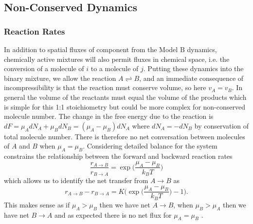 \subsection{Non-Conserved Dynamics}

\subsubsection{Reaction Rates}
In addition to spatial fluxes of component from the Model B dynamics, chemically active mixtures will also permit fluxes in chemical space, i.e. the conversion of a molecule of $i$ to a molecule of $j$. Putting these dynamics into the binary mixture, we allow the reaction $A \rightleftharpoons B$, and an immediate consequence of incompressibility is that the reaction must conserve volume, so here $v_A = v_B$. In general the volume of the reactants must equal the volume of the products which is simple for this 1:1 stoichiometry but could be more complex for non-conserved molecule number. The change in the free energy due to the reaction is $dF = \mu_A dN_A+\mu_B dN_B = (\mu_A - \mu_B)dN_A$ where $dN_A = -dN_B$ by conservation of total molecule number. There is therefore no net conversation between molecules of $A$ and $B$ when $\mu_A = \mu_B$. Considering detailed balance \cite{weber_drops_2021} for the system constrains the relationship between the forward and backward reaction rates
\begin{equation}
    \frac{r_{A \rightarrow B}}{r_{B \rightarrow A}} = \exp\Bigg(\frac{\mu_A - \mu_B}{k_B T}\Bigg)
    \label{db_constr}
\end{equation}
which allows us to identify the net transfer from $A \rightarrow B$ as
\begin{equation}
    r_{A \rightarrow B} - r_{B \rightarrow A} = K\Bigg(\exp\bigg(\frac{\mu_A - \mu_B}{k_B T}\bigg)-1\Bigg).
    \label{eq:2-sponrate}
\end{equation}
This makes sense as if $\mu_A > \mu_B$ then we have net $A \rightarrow B$, when $\mu_B > \mu_A$ then we have net $B \rightarrow A$ and as expected there is no net flux for $\mu_A = \mu_B$ \cite{weber2019physics}.

